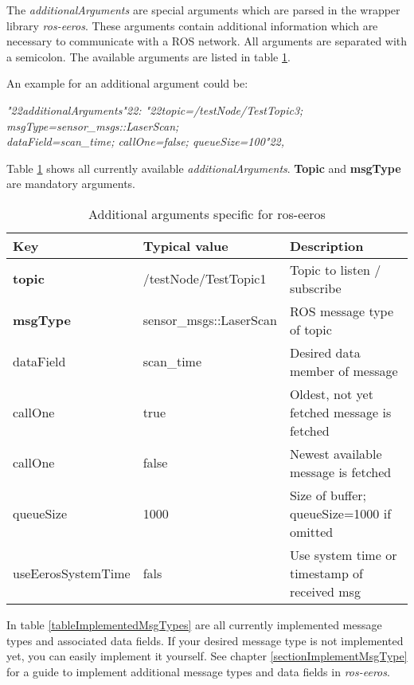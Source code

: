 The \textit{additionalArguments} are special arguments which are parsed in the wrapper library \textit{ros-eeros}.
These arguments contain additional information which are necessary to communicate with a ROS network.
All arguments are separated with a semicolon.
The available arguments are listed in table \ref{tableAdditionalArgumentsEeros}.

An example for an additional argument could be:

\begin{snugshade*}
\textit{\char"22additionalArguments\char"22: \char"22topic=/testNode/TestTopic3; msgType=sensor\_msgs::LaserScan; \\
dataField=scan\_time; callOne=false; queueSize=100\char"22,}
\end{snugshade*}


Table \ref{tableAdditionalArgumentsEeros} shows all currently available \textit{additionalArguments}.
\textbf{Topic} and \textbf{msgType} are mandatory arguments.

\begin{table}
\centering
\caption{Additional arguments specific for ros-eeros}
\label{tableAdditionalArgumentsEeros}
\begin{tabular}{@{}lll@{}}
\toprule
Key        & Typical value           & Description                                \\ \midrule
\textbf{topic}      & /testNode/TestTopic1    & Topic to listen / subscribe                \\
\textbf{msgType }   & sensor\_msgs::LaserScan & ROS message type of topic                  \\ 
dataField & scan\_time              & Desired data member of message             \\
callOne    & true                    & Oldest, not yet fetched message is fetched \\
callOne    & false                   & Newest available message is fetched        \\
queueSize  & 1000                    & Size of buffer; queueSize=1000 if omitted  \\ 
useEerosSystemTime  & fals           & Use system time or timestamp of received msg  \\ \bottomrule
\end{tabular}
\end{table}

In table \ref{tableImplementedMsgTypes} are all currently implemented message types and associated data fields.
If your desired message type is not implemented yet, you can easily implement it yourself.
See chapter \ref{sectionImplementMsgType} for a guide to implement additional message types and data fields in \textit{ros-eeros}.

